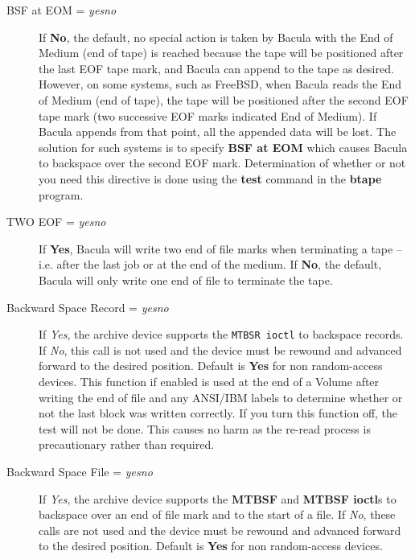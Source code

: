 \begin{description}
\item [BSF at EOM = {\it yes\vb{}no}]
   If {\bf No}, the default, no special action is taken by Bacula with the End
   of Medium (end of tape) is reached because the tape will be positioned after
   the last EOF tape mark, and Bacula can append to the tape as desired.
   However, on some systems, such as FreeBSD, when Bacula reads the End of
   Medium (end of tape), the tape will be positioned after the second EOF tape
   mark (two successive EOF marks indicated End of Medium). If Bacula appends
   from that point, all the appended data will be lost. The solution for such
   systems is to specify {\bf BSF at EOM} which causes Bacula to backspace over
   the second EOF mark. Determination of whether or not you need this directive
   is done using the {\bf test} command in the {\bf btape} program.

\item [TWO EOF = {\it yes\vb{}no}]
   If {\bf Yes}, Bacula will write two end of file marks when terminating a
   tape -- i.e. after the last job or at the end of the medium. If {\bf No},
   the default, Bacula will only write one end of file to terminate the tape.

\item [Backward Space Record = {\it yes\vb{}no}]
   If {\it Yes}, the archive device supports the {\tt MTBSR ioctl} to backspace
   records. If {\it No}, this call is not used and the device must be rewound
   and advanced forward to the desired position. Default is {\bf Yes} for non
   random-access devices. This function if enabled is used at the end of a
   Volume after writing the end of file and any ANSI/IBM labels to determine
   whether or not the last block was written correctly. If you turn this
   function off, the test will not be done. This causes no harm as the re-read
   process is precautionary rather than required.

\item [Backward Space File = {\it yes\vb{}no}]
   If {\it Yes}, the archive device supports the {\bf MTBSF} and  {\bf MTBSF
  ioctl}s to backspace over an end of file mark and to the  start of a file. If
  {\it No}, these calls are not used and the  device must be rewound and
  advanced forward to the desired position.  Default is {\bf Yes} for non
  random-access devices. 


\end{description}
